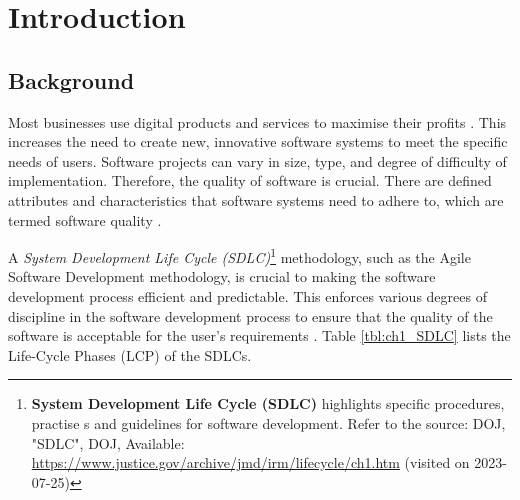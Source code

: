 \chapter{Introduction}
\label{chap:1}

\section{Background}\label{section:ch1_background}
Most businesses use digital products and services to maximise their profits \cite{Gralha2018}. This increases the need to create new, innovative software systems to meet the specific needs of users. Software projects can vary in size, type, and degree of difficulty of implementation. Therefore, the quality of software is crucial. There are defined attributes and characteristics that software systems need to adhere to, which are termed software quality \cite{Khan2013}. \par A \textit{System Development Life Cycle (SDLC)}\footnote{\textbf{System Development Life Cycle (SDLC)} highlights specific procedures, practise s and guidelines for software development. Refer to the source: DOJ, "SDLC", DOJ, Available: \url{https://www.justice.gov/archive/jmd/irm/lifecycle/ch1.htm} (visited on 2023-07-25)} methodology, such as the Agile Software Development methodology, is crucial to making the software development process efficient and predictable. This enforces various degrees of discipline in the software development process to ensure that the quality of the software is acceptable for the user's requirements \cite{Khan2013, Al-Saiyd2015}. Table \ref{tbl:ch1_SDLC} lists the Life-Cycle Phases (LCP) of the SDLCs.

